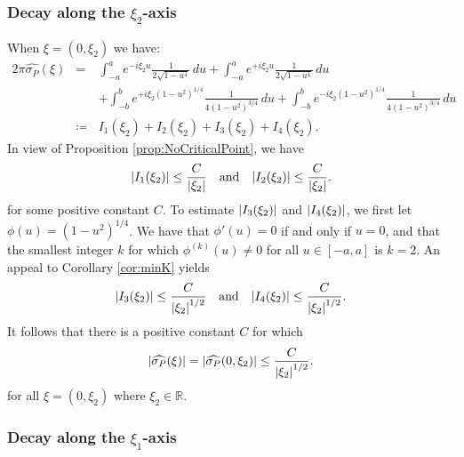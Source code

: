 \documentclass[11pt, letter]{book}
\newcommand{\f}[2]{\frac{#1}{#2}}
\begin{document}
\subsubsection{Decay along the $\xi_2$-axis}

When $\xi = (0,\xi_2)$ we have:
\begin{eqnarray*}
    2\pi \widehat{\sigma_P}(\xi) 
    &=& \int_{-a}^a  e^{-i \xi_2 u} \f{1}{2\sqrt{1-u^4}}\,du  + \int_{-a}^a  e^{+i \xi_2 u} \f{1}{2\sqrt{1-u^4}}\,du \\
    &\quad& + \int_{-b}^b e^{+i \xi_2 (1-u^2)^{1/4}} \f{1}{4(1 - u^2)^{3/4}} \,du + \int_{-b}^b e^{-i \xi_2 (1-u^2)^{1/4}} \f{1}{4(1 - u^2)^{3/4}}\,du \\
    &\coloneqq& I_1(\xi_2) + I_2(\xi_2) + I_3(\xi_2) + I_4(\xi_2).
\end{eqnarray*}
In view of Proposition \ref{prop:NoCriticalPoint}, we have
\begin{equation*}
    \abs{I_1(\xi_2)} \leq \f{C}{\abs{\xi_2}} \quad \mbox{and} \quad \abs{I_2(\xi_2)} \leq \f{C}{\abs{\xi_2}}.
\end{equation*}
for some positive constant $C$. To estimate $\abs{I_3(\xi_2)}$ and $\abs{I_4(\xi_2)}$, we first let $\phi(u) = (1-u^2)^{1/4}$. We have that $\phi'(u) = 0$ if and only if $u=0$, and that the smallest integer $k$ for which $\phi^{(k)}(u) \neq 0$ for all $u\in [-a,a]$ is $k=2$. An appeal to Corollary \ref{cor:minK} yields
\begin{equation*}
    \abs{I_3(\xi_2)} \leq \f{C}{\abs{\xi_2}^{1/2}} \quad \mbox{and} \quad \abs{I_4(\xi_2)} \leq \f{C}{\abs{\xi_2}^{1/2}}.
\end{equation*}
It follows that there is a positive constant $C$ for which
\begin{equation*}
    \abs{\widehat{\sigma_P}(\xi) }=\abs{\widehat{\sigma_P}(0,\xi_2) } \leq \f{C}{\abs{\xi_2}^{1/2}}.
\end{equation*}
for all $\xi=(0,\xi_2)$ where $\xi_2\in\mathbb{R}$.




\subsubsection{Decay along the $\xi_1$-axis}
\end{document}
